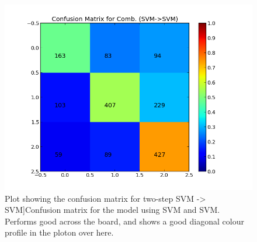 \begin{minipage}[s]{\linewidth}
\begin{minipage}{0.45\linewidth}
\begin{figure}[H]
                \includegraphics[width=\linewidth]{../img/plots/grid/confusion_matrix_Comb-SVM-SVM.png}
         Plot showing the confusion matrix for two-step SVM -> SVM]{Confusion matrix for the model using SVM and SVM. Performs good across the board, and shows a good diagonal colour profile in the ploton over here.}
            \label{fig:confmat_svm_svm}
           \end{figure}
      \end{minipage} \\
 

\end{minipage}

